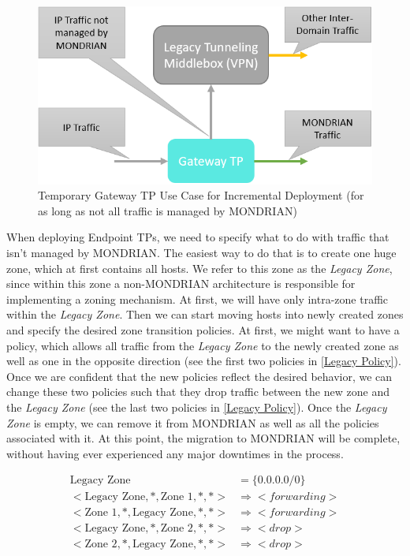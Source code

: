 \begin{figure}[t]
	\centering
	\includegraphics[width =.48\textwidth]{img/Gateway_TP_partial_incremental_deployment.png}
	\caption{Temporary Gateway \acs{TP} Use Case for Incremental Deployment (for as long as not all traffic is managed by MONDRIAN)}
	\label{Gateway TP Use Case for Incremental Deployment}
\end{figure}
\FloatBarrier
When deploying Endpoint \acsp{TP}, we need to specify what to do with traffic that isn't managed by MONDRIAN. The easiest way to do that is to create one huge zone, which at first contains all hosts. We refer to this zone as the \textit{Legacy Zone}, since within this zone a non-MONDRIAN architecture is responsible for implementing a zoning mechanism. At first, we will have only intra-zone traffic within the \textit{Legacy Zone}. Then we can start moving hosts into newly created zones and specify the desired zone transition policies. At first, we might want to have a policy, which allows all traffic from the \textit{Legacy Zone} to the newly created zone as well as one in the opposite direction (see the first two policies in \ref{Legacy Policy}). Once we are confident that the new policies reflect the desired behavior, we can change these two policies such that they drop traffic between the new zone and the \textit{Legacy Zone} (see the last two policies in \ref{Legacy Policy}). Once the \textit{Legacy Zone} is empty, we can remove it from MONDRIAN as well as all the policies associated with it. At this point, the migration to MONDRIAN will be complete, without having ever experienced any major downtimes in the process.

\begin{align}\label{Legacy Policy}
    \nonumber \text{Legacy Zone} &= \{0.0.0.0/0\}\\
    \nonumber <\text{Legacy Zone}, *, \text{Zone 1}, *, *>&\Rightarrow <forwarding>\\
    <\text{Zone 1}, *, \text{Legacy Zone}, *, *>&\Rightarrow <forwarding>\\
    \nonumber <\text{Legacy Zone}, *, \text{Zone 2}, *, *>&\Rightarrow <drop>\\
    \nonumber <\text{Zone 2}, *, \text{Legacy Zone}, *, *>&\Rightarrow <drop>
\end{align}

